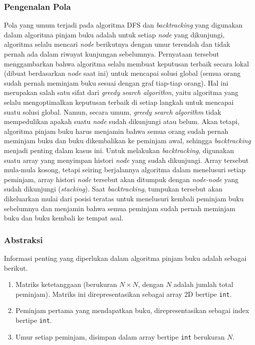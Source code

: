 \subsubsection{Pengenalan Pola}
Pola yang umum terjadi pada algoritma DFS dan \textit{backtracking} yang digunakan dalam algoritma pinjam buku adalah
untuk setiap \textit{node} yang dikunjungi, algoritma selalu mencari \textit{node} berikutnya dengan umur terendah dan tidak pernah ada dalam riwayat kunjungan sebelumnya.
Pernyataan tersebut menggambarkan bahwa algoritma selalu membuat keputusan terbaik secara lokal (dibuat berdasarkan \textit{node} saat ini) untuk mencapai solusi global (semua orang sudah pernah meminjam buku sesuai dengan graf tiap-tiap orang).
Hal ini merupakan salah satu sifat dari \textit{greedy search algorithm}, yaitu algoritma yang selalu mengoptimalkan keputusan terbaik di setiap langkah untuk mencapai suatu solusi global.
Namun, secara umum, \textit{greedy search algorithm} tidak mempedulikan apakah suatu \textit{node} sudah dikunjungi atau belum.
Akan tetapi, algoritma pinjam buku harus menjamin bahwa semua orang sudah pernah meminjam buku dan buku dikembalikan ke peminjam awal,
sehingga \textit{backtracking} menjadi penting dalam kasus ini. 
Untuk melakukan \textit{backtracking}, digunakan suatu array yang menyimpan histori \textit{node} yang sudah dikunjungi. 
Array tersebut mula-mula kosong, tetapi seiring berjalannya algoritma dalam menelusuri setiap peminjam,
array histori \textit{node} tersebut akan ditumpuk dengan \textit{node-node} yang sudah dikunjungi (\textit{stacking}).
Saat \textit{backtracking}, tumpukan tersebut akan dikeluarkan mulai dari posisi teratas untuk menelusuri kembali peminjam buku sebelumnya dan menjamin bahwa semua peminjam sudah pernah meminjam buku dan buku kembali ke tempat asal.
\subsubsection{Abstraksi}
Informasi penting yang diperlukan dalam algoritma pinjam buku adalah sebagai berikut.
\begin{enumerate}
    \item Matriks ketetanggaan (berukuran $N \times N$, dengan $N$ adalah jumlah total peminjam). Matriks ini direpresentasikan sebagai array 2D bertipe \lstinline|int|.
    \item Peminjam pertama yang mendapatkan buku, direpresentasikan sebagai index bertipe \lstinline|int|.
    \item Umur setiap peminjam, disimpan dalam array bertipe \lstinline|int| berukuran $N$.
\end{enumerate}